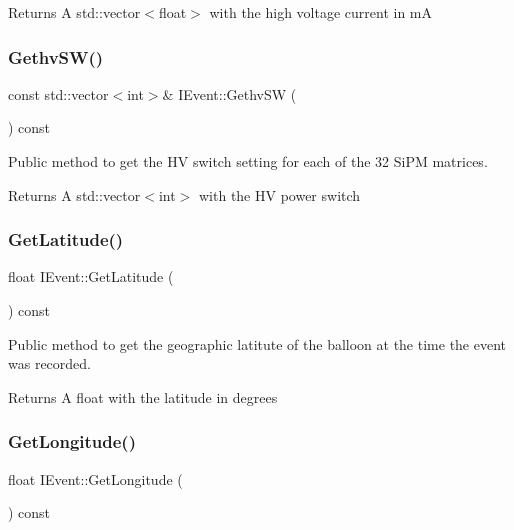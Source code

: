 \begin{DoxyReturn}{Returns}
A std\+::vector$<$float$>$ with the high voltage current in mA 
\end{DoxyReturn}
\mbox{\label{classIEvent_ab2e215d10ab78c04ef8c40a094dd5293}} 
\subsubsection{\texorpdfstring{Gethv\+S\+W()}{GethvSW()}}
{\footnotesize\ttfamily const std\+::vector$<$int$>$\& I\+Event\+::\+Gethv\+SW (\begin{DoxyParamCaption}{ }\end{DoxyParamCaption}) const}



Public method to get the HV switch setting for each of the 32 Si\+PM matrices. 

\begin{DoxyReturn}{Returns}
A std\+::vector$<$int$>$ with the HV power switch 
\end{DoxyReturn}
\mbox{\label{classIEvent_a38b7246b464616c40210b03289360f8b}} 
\subsubsection{\texorpdfstring{Get\+Latitude()}{GetLatitude()}}
{\footnotesize\ttfamily float I\+Event\+::\+Get\+Latitude (\begin{DoxyParamCaption}{ }\end{DoxyParamCaption}) const}



Public method to get the geographic latitute of the balloon at the time the event was recorded. 

\begin{DoxyReturn}{Returns}
A float with the latitude in degrees 
\end{DoxyReturn}
\mbox{\label{classIEvent_a1469bbbe341060a2b38180e235b2c1ec}} 
\subsubsection{\texorpdfstring{Get\+Longitude()}{GetLongitude()}}
{\footnotesize\ttfamily float I\+Event\+::\+Get\+Longitude (\begin{DoxyParamCaption}{ }\end{DoxyParamCaption}) const}




